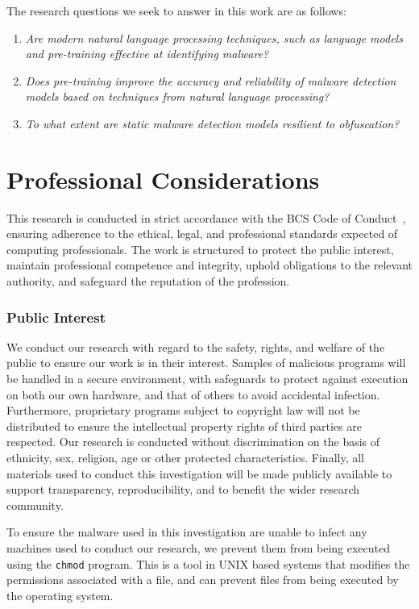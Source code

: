 \documentclass[main.tex]{subfiles}
\begin{document}
The research questions we seek to answer in this work are as follows: 

\begin{enumerate}[label=\textbf{RQ\arabic*}:]
    \item \emph{Are modern natural language processing techniques, such as language models and pre-training effective at identifying malware?}
    \item \emph{Does pre-training improve the accuracy and reliability of malware detection models based on techniques from natural language processing?}
    \item \emph{To what extent are static malware detection models resilient to obfuscation?}
\end{enumerate}


\section{Professional Considerations}

This research is conducted in strict accordance with the BCS Code of Conduct~\citep{britishcomputingsocietyBCSCodeConduct2022}, ensuring adherence to the ethical, legal, and professional standards expected of computing professionals. The work is structured to protect the public interest, maintain professional competence and integrity, uphold obligations to the relevant authority, and safeguard the reputation of the profession.

\subsubsection{Public Interest}

We conduct our research with regard to the safety, rights, and welfare of the public to ensure our work is in their interest. Samples of malicious programs will be handled in a secure environment, with safeguards to protect against execution on both our own hardware, and that of others to avoid accidental infection. Furthermore, proprietary programs subject to copyright law will not be distributed to ensure the intellectual property rights of third parties are respected. Our research is conducted without discrimination on the basis of ethnicity, sex, religion, age or other protected characteristics. Finally, all materials used to conduct this investigation will be made publicly available to support transparency, reproducibility, and to benefit the wider research community. 

To ensure the malware used in this investigation are unable to infect any machines used to conduct our research, we prevent them from being executed using the \texttt{chmod} program. This is a tool in UNIX based systems that modifies the permissions associated with a file, and can prevent files from being executed by the operating system. 
\end{document}
